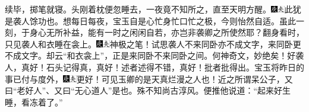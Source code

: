 {续毕，掷笔就寝。头刚着枕便忽睡去，一夜竟不知所之，直至天明方醒。{\includegraphics[width=3mm]{../Images/00004}\includegraphics[width=3mm]{../Images/00012}\footnotesize \kaishu 此犹是袭人馀功也。想每日每夜，宝玉自是心忙身忙口忙之极，今则怡然自适。虽此一刻，于身心无所补益，能有一时之闲闲自若，亦岂非袭卿之所使然耶？}翻身看时，只见袭人和衣睡在衾上。{\includegraphics[width=3mm]{../Images/00004}\includegraphics[width=3mm]{../Images/00012}\footnotesize \kaishu 神极之笔！试思袭人不来同卧亦不成文字，来同卧更不成文字。却云“和衣衾上”，正是来同卧不来同卧之间。何神奇文，妙绝矣！好袭人，真好！石头记得真，真好！述者述得不错，真好！批者批得出。}宝玉将昨日的事已付与度外，{\includegraphics[width=3mm]{../Images/00004}\includegraphics[width=3mm]{../Images/00012}\footnotesize \kaishu 更好！可见玉卿的是天真烂漫之人也！近之所谓呆公子，又曰“老好人”、又曰“无心道人”是也。殊不知尚古淳风。}便推他说道：“起来好生睡，看冻着了。”

}
